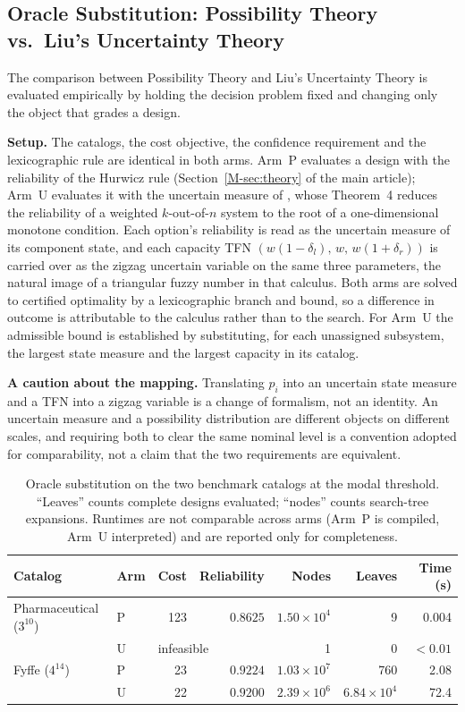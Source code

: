 \documentclass[11pt]{article}
\begin{document}
\subsection{Oracle Substitution: Possibility Theory vs.\ Liu's Uncertainty Theory} \label{sec:supp_uncertainty_baseline}

The comparison between Possibility Theory and Liu's Uncertainty Theory is evaluated empirically by holding the decision problem fixed and changing only the object that grades a design.

\textbf{Setup.} The catalogs, the cost objective, the confidence requirement and the lexicographic rule are identical in both arms. Arm~P evaluates a design with the reliability of the Hurwicz rule (Section~\ref*{M-sec:theory} of the main article); Arm~U evaluates it with the uncertain measure of \citet{WeiShiZhang2025a}, whose Theorem~4 reduces the reliability of a weighted $k$-out-of-$n$ system to the root of a one-dimensional monotone condition. Each option's reliability is read as the uncertain measure of its component state, and each capacity TFN $(w(1-\delta_l),\,w,\,w(1+\delta_r))$ is carried over as the zigzag uncertain variable on the same three parameters, the natural image of a triangular fuzzy number in that calculus. Both arms are solved to certified optimality by a lexicographic branch and bound, so a difference in outcome is attributable to the calculus rather than to the search. For Arm~U the admissible bound is established by substituting, for each unassigned subsystem, the largest state measure and the largest capacity in its catalog.

\textbf{A caution about the mapping.} Translating $p_i$ into an uncertain state measure and a TFN into a zigzag variable is a change of formalism, not an identity. An uncertain measure and a possibility distribution are different objects on different scales, and requiring both to clear the same nominal level is a convention adopted for comparability, not a claim that the two requirements are equivalent.

\begin{table}[htbp]
\centering
\caption{Oracle substitution on the two benchmark catalogs at the modal threshold. ``Leaves'' counts complete designs evaluated; ``nodes'' counts search-tree expansions. Runtimes are not comparable across arms (Arm~P is compiled, Arm~U interpreted) and are reported only for completeness.}
\label{tab:uncertainty_baseline}
\small
\begin{tabular}{llrrrrr}
\hline
Catalog & Arm & Cost & Reliability & Nodes & Leaves & Time (s)\\
\hline
Pharmaceutical ($3^{10}$) & P & 123 & $0.8625$ & $1.50\times10^{4}$ & 9 & 0.004\\
                          & U & \multicolumn{2}{l}{infeasible} & 1 & 0 & $<0.01$\\
Fyffe ($4^{14}$)          & P & 23 & $0.9224$ & $1.03\times10^{7}$ & 760 & 2.08\\
                          & U & 22 & $0.9200$ & $2.39\times10^{6}$ & $6.84\times10^{4}$ & 72.4\\
\hline
\end{tabular}
\end{table}
\end{document}
